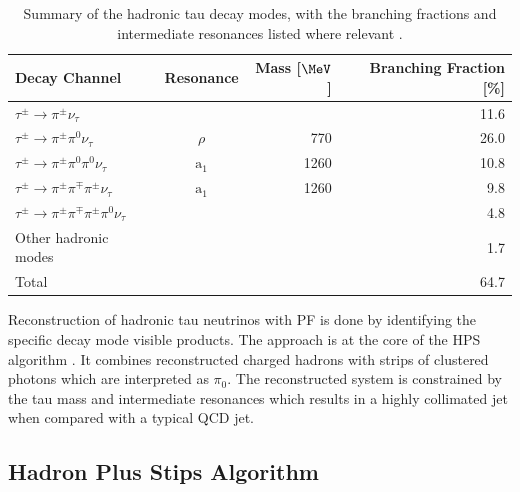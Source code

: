 \begin{table}[!htb]
\begin{tabular}{|l|c|r|r|}
\hline
Decay Channel & Resonance & Mass [$\MeV$] & Branching Fraction [\%] \\
\hline\hline
$\tau^{\pm} \rightarrow \pi^{\pm} \nu_\tau$                              &                &      & 11.6 \\
$\tau^{\pm} \rightarrow \pi^{\pm} \pi^{0}   \nu_\tau$                    & $\rho$         &  770 & 26.0 \\
$\tau^{\pm} \rightarrow \pi^{\pm} \pi^{0}   \pi^{0}   \nu_\tau$          & $\text{a}_{1}$ & 1260 & 10.8 \\
$\tau^{\pm} \rightarrow \pi^{\pm} \pi^{\mp} \pi^{\pm} \nu_\tau$          & $\text{a}_{1}$ & 1260 &  9.8 \\
$\tau^{\pm} \rightarrow \pi^{\pm} \pi^{\mp} \pi^{\pm} \pi^{0} \nu_\tau$  &                &      &  4.8 \\
\hline
Other hadronic modes                                                     &                &      &  1.7 \\
\hline\hline
Total & &  & 64.7 \\
\hline
\end{tabular}
\caption[Summary of the hadronic tau decay modes.]{Summary of the hadronic tau decay modes, with the branching fractions and intermediate resonances listed where relevant \cite{ARTICLE:PDG}.}
\label{TABLE:EventReconstructionAndSimulation_TauDecays}
\end{table}

Reconstruction of hadronic tau neutrinos with \gls{PF} is done by identifying the specific decay mode visible products. The approach is at the core of the \gls{HPS} algorithm \cite{ARTICLE:CMSPerformaceOfTauLeptonReconstruction,ARTICLE:CMSReconstructionIndentificationTau}. It combines reconstructed charged hadrons with strips of clustered photons which are interpreted as $\pi_0$. The reconstructed system is constrained by the tau mass and intermediate resonances which results in a highly collimated jet when compared with a typical \gls{QCD} jet.

\subsection{Hadron Plus Stips Algorithm}
\label{SECTION:EventReconstructionAndSimulation_Taus_HPSAlgorithm}

